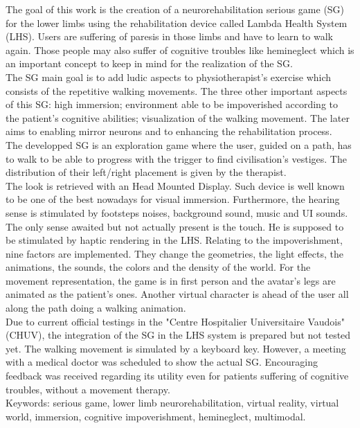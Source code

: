 
The goal of this work is the creation of a neurorehabilitation serious game (SG) for the lower limbs using the rehabilitation device called Lambda Health System (LHS). Users are suffering of paresis in those limbs and have to learn to walk again. Those people may also suffer of cognitive troubles like hemineglect which is an important concept to keep in mind for the realization of the SG.
\\

The SG main goal is to add ludic aspects to physiotherapist's exercise which consists of the repetitive walking movements. The three other important aspects of this SG: high immersion; environment able to be impoverished according to the patient's cognitive abilities; visualization of the walking movement. The later aims to enabling mirror neurons and to enhancing the rehabilitation process. 
\\
 
The developped SG is an exploration game where the user, guided on a path, has to walk to be able to progress with the trigger to find civilisation's vestiges. The distribution of their left/right placement is given by the therapist.
\\

The look is retrieved with an Head Mounted Display. Such device is well known to be one of the best nowadays for visual immersion. Furthermore, the hearing sense is stimulated by footsteps noises, background sound, music and UI sounds. The only sense awaited but not actually present is the touch. He is supposed to be stimulated by haptic rendering in the LHS. Relating to the impoverishment, nine factors are implemented. They change the geometries, the light effects, the animations, the sounds, the colors and the density of the world. For the movement representation, the game is in first person and the avatar's legs are animated as the patient's ones. Another virtual character is ahead of the user all along the path doing a walking animation.
\\

Due to current official testings in the "Centre Hospitalier Universitaire Vaudois" (CHUV), the integration of the SG in the LHS system is prepared but not tested yet. The walking movement is simulated by a keyboard key. However, a meeting with a medical doctor was scheduled to show the actual SG. Encouraging feedback was received regarding its utility even for patients suffering of cognitive troubles, without a movement therapy.
\\

Keywords: serious game, lower limb neurorehabilitation, virtual reality, virtual world, immersion, cognitive impoverishment, hemineglect, multimodal.

